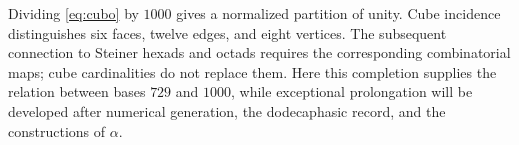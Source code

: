 Dividing \eqref{eq:cubo} by \(1000\) gives a normalized partition of unity. Cube incidence distinguishes six faces, twelve edges, and eight vertices. The subsequent connection to Steiner hexads and octads requires the corresponding combinatorial maps; cube cardinalities do not replace them. Here this completion supplies the relation between bases \(729\) and \(1000\), while exceptional prolongation will be developed after numerical generation, the dodecaphasic record, and the constructions of \(\alpha\).





